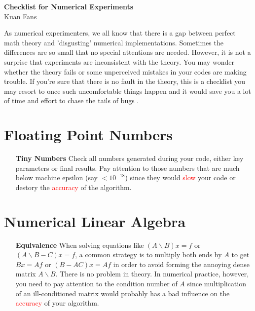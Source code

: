 \documentclass[a4paper,10pt]{article}
\begin{document}
\begin{center}
\textbf{Checklist for Numerical Experiments}\\
\vspace{\baselineskip}
Kuan Fans
\end{center}

As numerical experimenters, we all know that there is a gap between perfect math theory and 'disgusting' numerical implementations. Sometimes the differences are so small that no special attentions are needed. However, it is not a surprise that experiments are inconsistent with the theory. You may wonder whether the theory fails or some unperceived mistakes in your codes are making trouble. If you're sure that there is no fault in the theory, this is a checklist you may resort to once such uncomfortable things happen and it would save you a lot of time and effort to chase the tails of bugs \cite{Kuanfans}.

\tableofcontents

\section{Floating Point Numbers}


\begin{enumerate}
    \item [\textbf{Tiny Numbers}] Check all numbers generated during your code, either key parameters or final results. Pay attention to those numbers that are much below machine epsilon (say $<10^{-18}$) since they would \textcolor{red}{slow} your code or destory the \textcolor{red}{accuracy} of the algorithm.
\end{enumerate}


\section{Numerical Linear Algebra}


\begin{enumerate}
    \item [\textbf{Equivalence}] When solving equations like $(A \backslash B) x = f$ or $(A \backslash B - C) x = f$, a common strategy is to multiply both ends by $A$ to get $Bx = Af$ or $(B - AC)x = Af$ in order to avoid forming the annoying dense matrix $A \backslash B$. There is no problem in theory. In numerical practice, however, you need to pay attention to the condition number of $A$ since multiplication of an ill-conditioned matrix would probably has a bad influence on the \textcolor{red}{accuracy} of your algorithm.
\end{enumerate}
\end{document}
